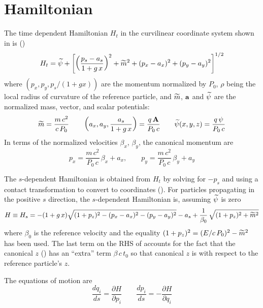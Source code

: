 \section{Hamiltonian}
\label{s:mag.hamiltonian}
The time dependent Hamiltonian $H_t$ in the curvilinear coordinate system shown
in  is (\cite{b:ruth})
\begin{equation}
  H_t = \widetilde\psi + \left[ \left( \frac{p_s - a_s}{1 + g\, x} \right)^2 + \widetilde m^2 + 
  (p_x - a_x)^2 + (p_y - a_y)^2 \right]^{1/2}
\end{equation}
where $(p_x, p_y, p_s/(1+gx))$ are the momentum normalized by $P_0$, $\rho$ being the local radius
of curvature of the reference particle, and $\widetilde m$, ${\bf a}$ and $\widetilde\psi$ are the normalized mass,
vector, and scalar potentials:
\begin{equation}
  \widetilde m = \frac{m \, c^2}{c \, P_0} \qquad
  \left( a_x, a_y, \frac{a_s}{1+g \, x} \right) = \frac{q \, {\bf A}}{P_0 \, c} \qquad 
  \widetilde\psi(x,y,z) = \frac{q \, \psi}{P_0 \, c}
  \label{mmccp}
\end{equation}
In terms of the normalized velocities $\beta_x$, $\beta_y$, the canonical momentum are
\begin{equation}
  p_x = \frac{m \, c^2}{P_0 \, c} \, \beta_x + a_x, \qquad 
  p_y = \frac{m \, c^2}{P_0 \, c} \, \beta_y + a_y
  \label{pmc2pc}
\end{equation}

The $s$-dependent Hamiltonian is obtained from $H_t$ by solving for
$-p_s$ and using a contact transformation to convert to \bmad
coordinates (). For particles propagating in the
positive $s$ direction, the $s$-dependent Hamiltonian is, assuming
$\widetilde\psi$ is zero
\begin{equation}
  H \equiv H_s = -(1 + g \, x) \sqrt{(1 + p_z)^2 - (p_x - a_x)^2 - (p_y - a_y)^2} - 
  a_s + \frac{1}{\beta_0} \, \sqrt{(1+p_z)^2 + \widetilde m^2}
  \label{h1gx1}
\end{equation}
where $\beta_0$ is the reference velocity and the equality $(1 +
p_z)^2 = (E/c\, P_0)^2 - \widetilde m^2$ has been used. The last term on the
RHS of  accounts for the fact that the \bmad canonical $z$
() has an ``extra'' term $\beta \, c \, t_0$ so that \bmad
canonical $z$ is with respect to the reference particle's $z$.

The equations of motion are
\begin{equation}
  \frac{dq_i}{ds} = \frac{\partial H}{\partial p_i} \qquad
  \frac{dp_i}{ds} = -\frac{\partial H}{\partial q_i}
  \label{rshp}
\end{equation}

